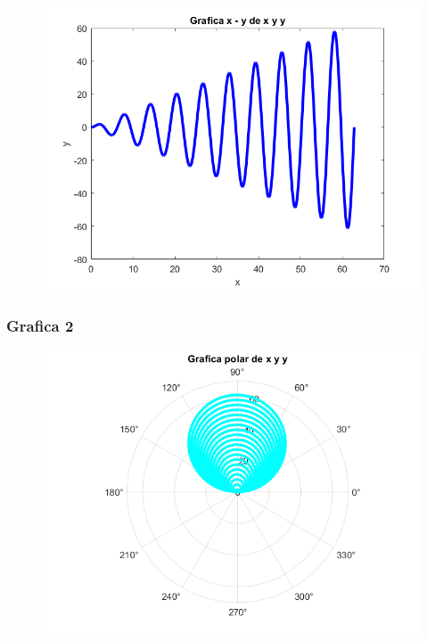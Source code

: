 \documentclass{article}
\begin{document}
	\begin{figure}[h]
		\centering
		\includegraphics[width=\textwidth]{grafica21a.png}
	\end{figure}
	
	\newpage
	
	\subsubsection{Grafica 2}
	
	\begin{figure}[h]
		\centering
		\includegraphics[width=\textwidth]{grafica21b.png}
	\end{figure}
	
	\newpage
	
\end{document}
